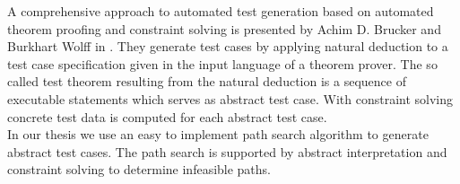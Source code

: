 A comprehensive approach to automated test generation based on automated theorem proofing and constraint solving is presented by Achim D. Brucker and Burkhart Wolff in \cite{brucker2012theoremProverBasedTesting}. They generate test cases by applying natural deduction to a %
test case specification given in the input language of a theorem prover. The so called test theorem resulting from the natural deduction is a sequence of executable statements which serves as abstract test case. With constraint solving concrete test data is computed for each abstract test case.\\
In our thesis we use an easy to implement path search algorithm to generate abstract test cases. The path search is supported by abstract interpretation and constraint solving to determine infeasible paths.
% 
